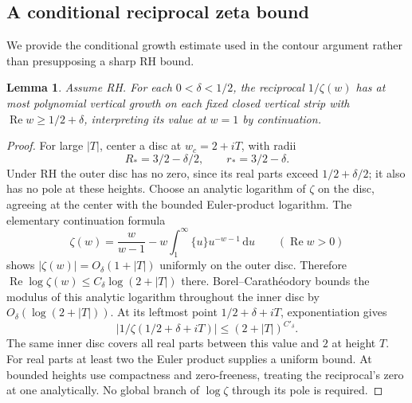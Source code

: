 \documentclass[11pt]{article}
\newtheorem{lemma}[theorem]{Lemma}
\theoremstyle{remark}\newtheorem{remark}[theorem]{Remark}
\DeclareMathOperator{\Rea}{Re}
\newcommand{\dd}{\,\mathrm d}
\numberwithin{equation}{section}
\begin{document}
\subsection{A conditional reciprocal zeta bound}
We provide the conditional growth estimate used in the contour argument rather than presupposing a sharp RH bound.
\begin{lemma}\label{udp:lem:RHreciprocal}
Assume RH. For each $0<\delta<1/2$, the reciprocal $1/\zeta(w)$ has at most polynomial vertical growth on each fixed closed vertical strip with $\Rea w\ge1/2+\delta$, interpreting its value at $w=1$ by continuation.
\end{lemma}
\begin{proof}
For large $|T|$, center a disc at $w_c=2+iT$, with radii
\[
 R_*=3/2-\delta/2,\qquad r_*=3/2-\delta.
\]
Under RH the outer disc has no zero, since its real parts exceed $1/2+\delta/2$; it also has no pole at these heights. Choose an analytic logarithm of $\zeta$ on the disc, agreeing at the center with the bounded Euler-product logarithm. The elementary continuation formula
\[
 \zeta(w)=\frac{w}{w-1}-w\int_1^\infty\{u\}u^{-w-1}\dd u
 \qquad(\Rea w>0)
\]
shows $|\zeta(w)|=O_\delta(1+|T|)$ uniformly on the outer disc. Therefore $\Rea\log\zeta(w)\le C_\delta\log(2+|T|)$ there. Borel--Carath\'eodory bounds the modulus of this analytic logarithm throughout the inner disc by $O_\delta(\log(2+|T|))$. At its leftmost point $1/2+\delta+iT$, exponentiation gives
\[
 |1/\zeta(1/2+\delta+iT)|\le(2+|T|)^{C'_{\delta}}.
\]
The same inner disc covers all real parts between this value and $2$ at height $T$. For real parts at least two the Euler product supplies a uniform bound. At bounded heights use compactness and zero-freeness, treating the reciprocal's zero at one analytically. No global branch of $\log\zeta$ through its pole is required.
\end{proof}
\end{document}

